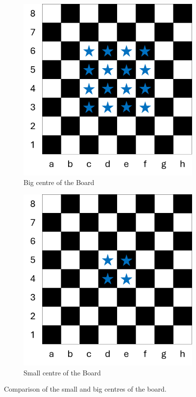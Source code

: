 \documentclass{article}
\begin{document}
\begin{figure}[h]
    \centering
    \begin{subfigure}[b]{0.4\textwidth}
        \centering
        \includegraphics[width=\textwidth]{images/bigCentre.png}
        \caption{Big centre of the Board}
        \label{fig:bigcentre}
    \end{subfigure}
    \hfill
    \begin{subfigure}[b]{0.4\textwidth}
        \centering
        \includegraphics[width=\textwidth]{images/smallCentre.png}
        \caption{Small centre of the Board}
        \label{fig:smallcentre}
    \end{subfigure}
    \caption{Comparison of the small and big centres of the board.}
    \label{fig:centres}
\end{figure}
\end{document}
